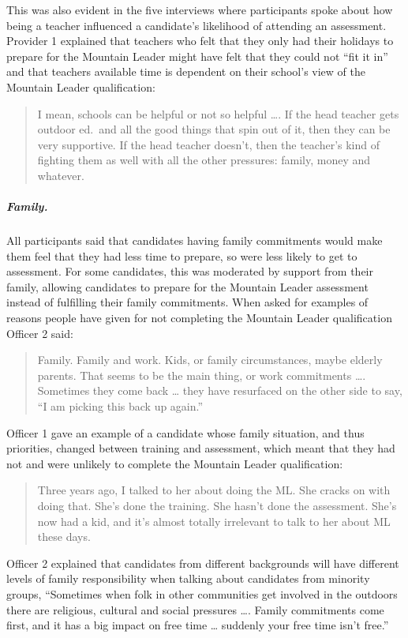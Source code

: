 \documentclass[
  12pt,
  a4paper,
]{book}
\begin{document}
This was also evident in the five interviews where participants spoke about how being a teacher influenced a candidate's likelihood of attending an assessment. Provider 1 explained that teachers who felt that they only had their holidays to prepare for the Mountain Leader might have felt that they could not ``fit it in'' and that teachers available time is dependent on their school's view of the Mountain Leader qualification:

\begin{quote}
I mean, schools can be helpful or not so helpful \ldots. If the head teacher gets outdoor ed.~and all the good things that spin out of it, then they can be very supportive. If the head teacher doesn't, then the teacher's kind of fighting them as well with all the other pressures: family, money and whatever.
\end{quote}

\hypertarget{family.}{%
\subparagraph{Family.}\label{family.}}

All participants said that candidates having family commitments would make them feel that they had less time to prepare, so were less likely to get to assessment. For some candidates, this was moderated by support from their family, allowing candidates to prepare for the Mountain Leader assessment instead of fulfilling their family commitments. When asked for examples of reasons people have given for not completing the Mountain Leader qualification Officer 2 said:

\begin{quote}
Family. Family and work. Kids, or family circumstances, maybe elderly parents. That seems to be the main thing, or work commitments \ldots. Sometimes they come back \ldots{} they have resurfaced on the other side to say, ``I am picking this back up again.''
\end{quote}

Officer 1 gave an example of a candidate whose family situation, and thus priorities, changed between training and assessment, which meant that they had not and were unlikely to complete the Mountain Leader qualification:

\begin{quote}
Three years ago, I talked to her about doing the ML. She cracks on with doing that. She's done the training. She hasn't done the assessment. She's now had a kid, and it's almost totally irrelevant to talk to her about ML these days.
\end{quote}

Officer 2 explained that candidates from different backgrounds will have different levels of family responsibility when talking about candidates from minority groups, ``Sometimes when folk in other communities get involved in the outdoors there are religious, cultural and social pressures \ldots. Family commitments come first, and it has a big impact on free time \ldots{} suddenly your free time isn't free.''
\end{document}
